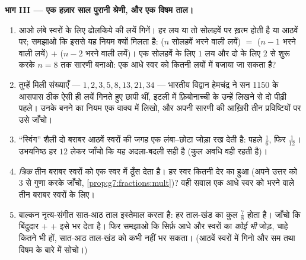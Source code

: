 \begin{problem}
\medskip
\noindent\textbf{भाग III --- एक हज़ार साल पुरानी श्रेणी, और एक
विषम ताल।}
\begin{enumerate}[resume]
  \item आओ लंबे स्वरों के लिए ढोलकिये की लयें गिनें। हर लय या तो
        सोलहवें पर ख़त्म होती है या आठवें पर; समझाओ कि इससे यह
        नियम क्यों मिलता है: ($n$ सोलहवें भरने वाली लयें) $=$
        ($n - 1$ भरने वाली लयें) $+$ ($n - 2$ भरने वाली लयें)। एक
        सोलहवें के लिए $1$ लय और दो के लिए $2$ से शुरू करके
        $n = 8$ तक सारणी बनाओ: एक आधे स्वर को कितनी लयों में
        बजाया जा सकता है?
  \item तुम्हें मिली संख्याएँ --- $1, 2, 3, 5, 8, 13, 21, 34$ ---
        भारतीय विद्वान हेमचंद्र ने सन 1150 के आसपास ठीक ऐसी ही
        लयें गिनते हुए छापी थीं, इटली में फ़िबोनाच्ची के उन्हें
        लिखने से दो पीढ़ी पहले। उनके बनने का नियम एक वाक्य में
        लिखो, और अपनी सारणी की आख़िरी तीन प्रविष्टियों पर उसे
        जाँचो।
  \item ``स्विंग'' शैली दो बराबर आठवें स्वरों की जगह एक
        लंबा--छोटा जोड़ा रख देती है: पहले $\frac16$, फिर
        $\frac{1}{12}$। उभयनिष्ठ हर $12$ लेकर जाँचो कि यह
        अदला-बदली सही है (कुल अवधि वही रहती है)।
  \item \emph{त्रिक} तीन बराबर स्वरों को एक  स्वर में ठूँस
        देता है। हर स्वर कितनी देर का हुआ (अपने उत्तर को $3$ से
        गुणा करके जाँचो, \cref{prop:g7:fractions:mult})? वही सवाल
        एक आधे स्वर को भरने वाले तीन बराबर स्वरों के लिए।
  \item बाल्कन नृत्य-संगीत सात-आठ ताल इस्तेमाल करता है: हर
        ताल-खंड का कुल $\frac78$ होता है। जाँचो कि बिंदुदार 
        $+$  $+$  इसे भर देता है। फिर समझाओ कि सिर्फ़
        आधे और  स्वरों का \emph{कोई भी} जोड़, चाहे कितने भी
        हों, सात-आठ ताल-खंड को कभी नहीं भर सकता। (आठवें स्वरों
        में गिनो और सम तथा विषम के बारे में सोचो।)

\end{enumerate}
\end{problem}
